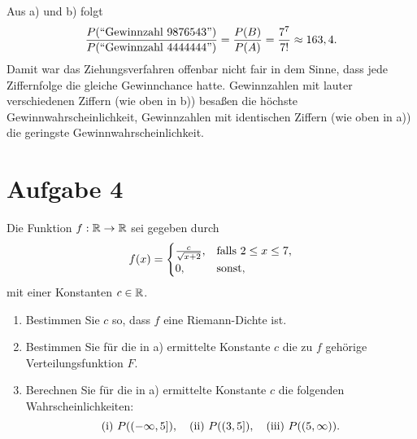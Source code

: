 \documentclass{exercise}
\begin{document}
    Aus a) und b) folgt
    \[
        \frac{P\parentheses*{\text{``Gewinnzahl }9876543\text{''}}}{P\parentheses*{\text{``Gewinnzahl }4444444\text{''}}} = \frac{P\parentheses*{B}}{P\parentheses*{A}} = \frac{7^7}{7!} \approx 163,4.
    \]
    Damit war das Ziehungsverfahren offenbar nicht fair in dem Sinne, dass jede Ziffernfolge die gleiche Gewinnchance hatte.
    Gewinnzahlen mit lauter verschiedenen Ziffern (wie oben in b)) besaßen die höchste Gewinnwahrscheinlichkeit, Gewinnzahlen mit identischen Ziffern (wie oben in a)) die geringste Gewinnwahrscheinlichkeit.


    \section*{Aufgabe 4}

    \begin{problem}
        Die Funktion \(f: \mathbb{R} \to \mathbb{R}\) sei gegeben durch
        \[
            f\parentheses*{x} = \begin{cases}
                \frac{c}{\sqrt{x + 2}}, & \text{falls }2 \le x \le 7,\\
                0, & \text{sonst},
            \end{cases}
        \]
        mit einer Konstanten \(c \in \mathbb{R}\).
        \begin{enumerate}
            \item Bestimmen Sie \(c\) so, dass \(f\) eine Riemann-Dichte ist.
            \item Bestimmen Sie für die in a) ermittelte Konstante \(c\) die zu \(f\) gehörige Verteilungsfunktion \(F\).
            \item Berechnen Sie für die in a) ermittelte Konstante \(c\) die folgenden Wahrscheinlichkeiten:
            \[
                \text{(i) }P\parentheses*{\left(-\infty, 5\right]}, \quad \text{(ii) }P\parentheses*{\left(3, 5\right]}, \quad \text{(iii) }P\parentheses*{\parentheses*{5, \infty}}.
            \]
        \end{enumerate}
    \end{problem}
\end{document}
